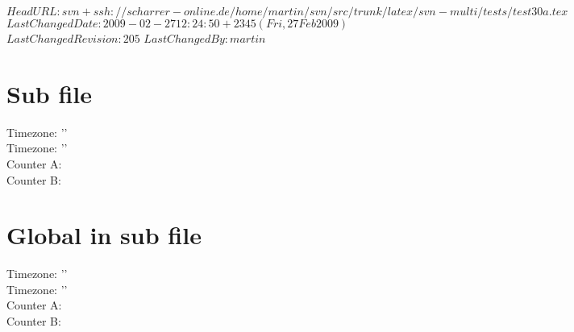 \svnidlong
{$HeadURL: svn+ssh://scharrer-online.de/home/martin/svn/src/trunk/latex/svn-multi/tests/test30a.tex $}
{$LastChangedDate: 2009-02-27 12:24:50 +2345 (Fri, 27 Feb 2009) $}
{$LastChangedRevision: 205 $}
{$LastChangedBy: martin $}


\section{Sub file}
Timezone:   '\svnfiletimezone'\\
Timezone:   ''\\
\setcounter{mytimeza}{\svnfiletimezone}
\setcounter{mytimezb}{\svnfiletimezone00}
Counter A: \themytimeza\\
Counter B: \themytimezb\\
%
%
\ifthenelse{\themytimeza = \themytimezb}{}{\error}%

\section{Global in sub file}
Timezone:   '\svntimezone'\\
Timezone:   ''\\
\setcounter{mytimeza}{\svntimezone}
\setcounter{mytimezb}{\svntimezone00}
Counter A: \themytimeza\\
Counter B: \themytimezb\\
%
%
\ifthenelse{\themytimeza = \themytimezb}{}{\error}%

